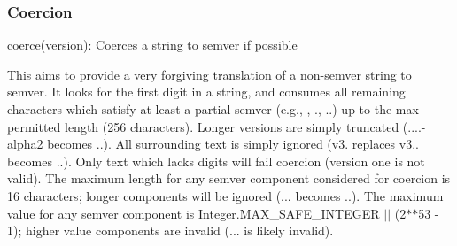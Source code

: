 \subsubsection*{Coercion}


\begin{DoxyItemize}
\item {\ttfamily coerce(version)}\+: Coerces a string to semver if possible
\end{DoxyItemize}

This aims to provide a very forgiving translation of a non-\/semver string to semver. It looks for the first digit in a string, and consumes all remaining characters which satisfy at least a partial semver (e.\+g., {}, {.}, {..}) up to the max permitted length (256 characters). Longer versions are simply truncated ({....-\/alpha2} becomes {..}). All surrounding text is simply ignored ({\ttfamily v3. replaces v3..} becomes {..}). Only text which lacks digits will fail coercion ({\ttfamily version one} is not valid). The maximum length for any semver component considered for coercion is 16 characters; longer components will be ignored ({...} becomes {..}). The maximum value for any semver component is {\ttfamily Integer.\+M\+A\+X\+\_\+\+S\+A\+F\+E\+\_\+\+I\+N\+T\+E\+G\+ER $\vert$$\vert$ (2$\ast$$\ast$53 -\/ 1)}; higher value components are invalid ({...} is likely invalid). 